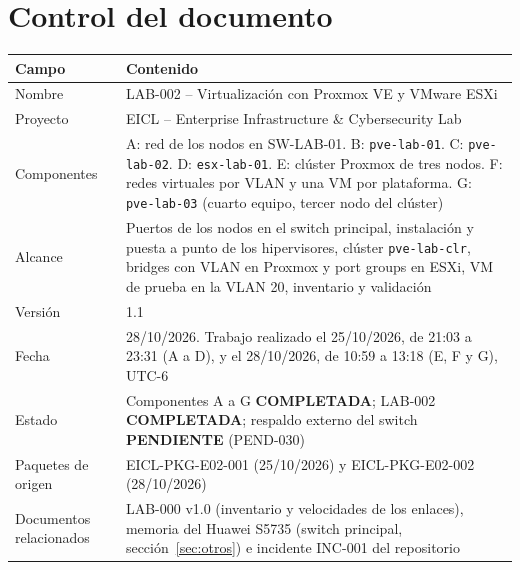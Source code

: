 \documentclass[11pt,a4paper]{article}
\newcommand{\estado}[1]{%
  \ifstrequal{#1}{COMPLETADA}{\textcolor{okgreen}{\textbf{\footnotesize #1}}}{%
  \ifstrequal{#1}{OPERATIVO VALIDADO}{\textcolor{okgreen}{\textbf{\footnotesize #1}}}{%
  \ifstrequal{#1}{OK}{\textcolor{okgreen}{\textbf{\footnotesize #1}}}{%
  \ifstrequal{#1}{RESUELTO}{\textcolor{okgreen}{\textbf{\footnotesize #1}}}{%
  \ifstrequal{#1}{EN CURSO}{\textcolor{amber}{\textbf{\footnotesize #1}}}{%
  \ifstrequal{#1}{REPORTADO}{\textcolor{amber}{\textbf{\footnotesize #1}}}{%
  \ifstrequal{#1}{NO EJECUTADA}{\textcolor{muted}{\textbf{\footnotesize #1}}}{%
  \ifstrequal{#1}{PROPUESTO}{\textcolor{violet}{\textbf{\footnotesize #1}}}{%
  \ifstrequal{#1}{PENDIENTE}{\textcolor{alertred}{\textbf{\footnotesize #1}}}{%
  \ifstrequal{#1}{FALLIDA}{\textcolor{alertred}{\textbf{\footnotesize #1}}}{%
  \textbf{\footnotesize #1}}}}}}}}}}}}
\newcommand{\cab}{\rowcolor{light}}
\begin{document}
\pagestyle{preliminar}
\hypersetup{pageanchor=true}

\section*{Control del documento}

\begin{tabularx}{\textwidth}{L{4.0cm} Z}
  \toprule
  \cab\textbf{Campo} & \textbf{Contenido}\\
  \midrule
  Nombre & LAB-002 -- Virtualización con Proxmox VE y VMware ESXi\\
  Proyecto & EICL -- Enterprise Infrastructure \& Cybersecurity Lab\\
  Componentes & A: red de los nodos en SW-LAB-01. B: \texttt{pve-lab-01}. C: \texttt{pve-lab-02}. D: \texttt{esx-lab-01}. E: clúster Proxmox de tres nodos. F: redes virtuales por VLAN y una VM por plataforma. G: \texttt{pve-lab-03} (cuarto equipo, tercer nodo del clúster)\\
  Alcance & Puertos de los nodos en el switch principal, instalación y puesta a punto de los hipervisores, clúster \texttt{pve-lab-clr}, bridges con VLAN en Proxmox y port groups en ESXi, VM de prueba en la VLAN 20, inventario y validación\\
  Versión & 1.1\\
  Fecha & 28/10/2026. Trabajo realizado el 25/10/2026, de 21:03 a 23:31 (A a D), y el 28/10/2026, de 10:59 a 13:18 (E, F y G), UTC-6\\
  Estado & Componentes A a G \estado{COMPLETADA}; LAB-002 \estado{COMPLETADA}; respaldo externo del switch \estado{PENDIENTE} (PEND-030)\\
  Paquetes de origen & EICL-PKG-E02-001 (25/10/2026) y EICL-PKG-E02-002 (28/10/2026)\\
  Documentos relacionados & LAB-000 v1.0 (inventario y velocidades de los enlaces), memoria del Huawei S5735 (switch principal, sección~\ref{sec:otros}) e incidente INC-001 del repositorio\\
  \bottomrule
\end{tabularx}
\end{document}
